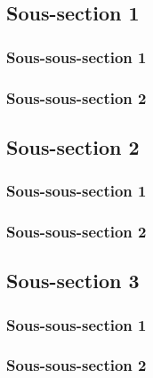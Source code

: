 
\subsection{Sous-section 1}
    \subsubsection{Sous-sous-section 1}


    \subsubsection{Sous-sous-section 2}

    
    \subsection{Sous-section 2}
        \subsubsection{Sous-sous-section 1}


        \subsubsection{Sous-sous-section 2}


    \subsection{Sous-section 3}
        \subsubsection{Sous-sous-section 1}


        \subsubsection{Sous-sous-section 2}


